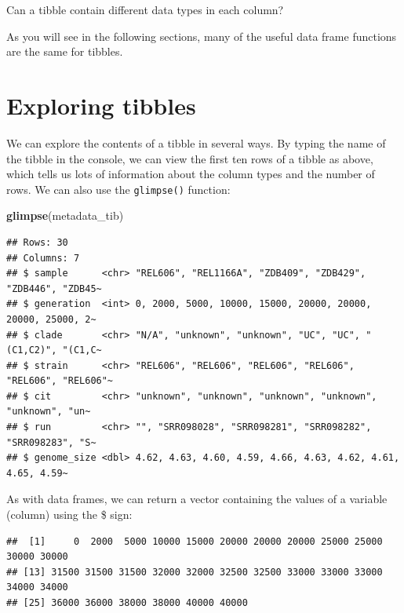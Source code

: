 \documentclass[
]{book}
\newenvironment{Shaded}{\begin{snugshade}}{\end{snugshade}}
\newcommand{\FunctionTok}[1]{\textcolor[rgb]{0.13,0.29,0.53}{\textbf{#1}}}
\newcommand{\NormalTok}[1]{#1}
\newcommand{\SpecialCharTok}[1]{\textcolor[rgb]{0.81,0.36,0.00}{\textbf{#1}}}
\begin{document}
Can a tibble contain different data types in each column?

As you will see in the following sections, many of the useful data frame functions are the same for tibbles.

\section{Exploring tibbles}\label{exploring-tibbles}

We can explore the contents of a tibble in several ways. By typing the name of the tibble in the console, we can view the first ten rows of a tibble as above, which tells us lots of information about the column types and the number of rows. We can also use the \texttt{glimpse()} function:

\begin{Shaded}
\begin{Highlighting}[]
\FunctionTok{glimpse}\NormalTok{(metadata\_tib)}
\end{Highlighting}
\end{Shaded}

\begin{verbatim}
## Rows: 30
## Columns: 7
## $ sample      <chr> "REL606", "REL1166A", "ZDB409", "ZDB429", "ZDB446", "ZDB45~
## $ generation  <int> 0, 2000, 5000, 10000, 15000, 20000, 20000, 20000, 25000, 2~
## $ clade       <chr> "N/A", "unknown", "unknown", "UC", "UC", "(C1,C2)", "(C1,C~
## $ strain      <chr> "REL606", "REL606", "REL606", "REL606", "REL606", "REL606"~
## $ cit         <chr> "unknown", "unknown", "unknown", "unknown", "unknown", "un~
## $ run         <chr> "", "SRR098028", "SRR098281", "SRR098282", "SRR098283", "S~
## $ genome_size <dbl> 4.62, 4.63, 4.60, 4.59, 4.66, 4.63, 4.62, 4.61, 4.65, 4.59~
\end{verbatim}

As with data frames, we can return a vector containing the values of a variable (column) using the \$ sign:

\begin{Shaded}
\end{Shaded}

\begin{verbatim}
##  [1]     0  2000  5000 10000 15000 20000 20000 20000 25000 25000 30000 30000
## [13] 31500 31500 31500 32000 32000 32500 32500 33000 33000 33000 34000 34000
## [25] 36000 36000 38000 38000 40000 40000
\end{verbatim}
\end{document}
